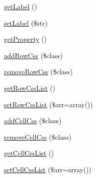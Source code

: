 \begin{DoxyCompactItemize}
\hyperlink{classTk_1_1Table_1_1Cell_1_1Iface_a0cad132c6db216a6326fde14f1c5cec0}{get\+Label} ()
\item 
\hyperlink{classTk_1_1Table_1_1Cell_1_1Iface_a31ffcf0df6c80e3cf45d3724a55f563e}{set\+Label} (\$str)
\item 
\hyperlink{classTk_1_1Table_1_1Cell_1_1Iface_a7a1c6a90b71c5c9ce9d29c0bf12cee14}{get\+Property} ()
\item 
\hyperlink{classTk_1_1Table_1_1Cell_1_1Iface_a975044b186f114ff3ce4c333c8e340b2}{add\+Row\+Css} (\$class)
\item 
\hyperlink{classTk_1_1Table_1_1Cell_1_1Iface_a7dce5bc2a569be6758419acba3ed15ed}{remove\+Row\+Css} (\$class)
\item 
\hyperlink{classTk_1_1Table_1_1Cell_1_1Iface_a32313e3a9e621bfac5e84b5ece724de4}{get\+Row\+Css\+List} ()
\item 
\hyperlink{classTk_1_1Table_1_1Cell_1_1Iface_a071b8a17259b0c662143a6cfd6db84fb}{set\+Row\+Css\+List} (\$arr=array())
\item 
\hyperlink{classTk_1_1Table_1_1Cell_1_1Iface_afd0023e50a4098dce84d1bf479e1a530}{add\+Cell\+Css} (\$class)
\item 
\hyperlink{classTk_1_1Table_1_1Cell_1_1Iface_a24de4dd57000d5a3941b3ad821d77b20}{remove\+Cell\+Css} (\$class)
\item 
\hyperlink{classTk_1_1Table_1_1Cell_1_1Iface_accd53793f78a824dc12953672fc49e7b}{get\+Cell\+Css\+List} ()
\item 
\hyperlink{classTk_1_1Table_1_1Cell_1_1Iface_a5d3867088c8a40a1b371a5f963335e98}{set\+Cell\+Css\+List} (\$arr=array())
\end{DoxyCompactItemize}
